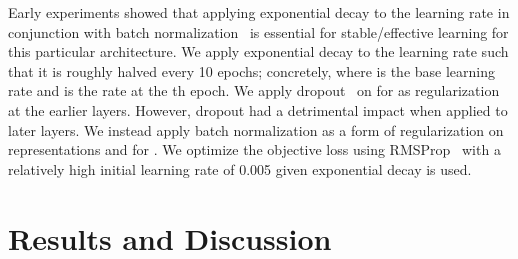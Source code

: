 \documentclass{clv3}
\begin{document}
Early experiments showed that applying exponential decay to the learning rate in conjunction with batch normalization~\cite{ioffe2015batch} is essential for stable/effective learning for this particular architecture.  We apply exponential decay to the learning rate such that it is roughly halved  every 10 epochs; concretely,  where  is the base learning rate and  is the rate at the th epoch. We apply dropout~\cite{srivastava2014dropout} on  for  as regularization at the earlier layers. However, dropout had a detrimental impact when applied to later layers. We instead apply batch normalization as a form of regularization on representations  and  for . We  optimize the objective loss using RMSProp~\cite{tieleman2012lecture} with a relatively high initial learning rate of 0.005 given exponential decay is used. 



\section{Results and Discussion}
\end{document}
